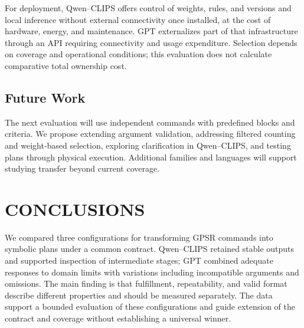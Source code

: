 \documentclass[a4paper,twoside]{article}
\begin{document}
For deployment, Qwen--CLIPS offers control of weights, rules, and versions and local inference without external connectivity once installed, at the cost of hardware, energy, and maintenance. GPT externalizes part of that infrastructure through an API requiring connectivity and usage expenditure. Selection depends on coverage and operational conditions; this evaluation does not calculate comparative total ownership cost.

\subsection{Future Work}
The next evaluation will use independent commands with predefined blocks and criteria. We propose extending argument validation, addressing filtered counting and weight-based selection, exploring clarification in Qwen--CLIPS, and testing plans through physical execution. Additional families and languages will support studying transfer beyond current coverage.

\section{CONCLUSIONS}
We compared three configurations for transforming GPSR commands into symbolic plans under a common contract. Qwen--CLIPS retained stable outputs and supported inspection of intermediate stages; GPT combined adequate responses to domain limits with variations including incompatible arguments and omissions. The main finding is that fulfillment, repeatability, and valid format describe different properties and should be measured separately. The data support a bounded evaluation of these configurations and guide extension of the contract and coverage without establishing a universal winner.







\end{document}
